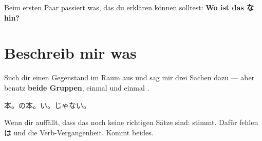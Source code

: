 \documentclass[11pt,a4paper,DIV=12]{scrartcl}
\begin{document}
\begin{merke}
Beim ersten Paar passiert was, das du erklären können solltest:
\textbf{Wo ist das な hin?}
\end{merke}

\section{Beschreib mir was}

Such dir einen Gegenstand im Raum aus und sag mir drei Sachen dazu — aber benutz
\textbf{beide Gruppen}, einmal \expl{} und einmal \impl{}.

\begin{center}
本。の本。い。じゃない。
\end{center}

Wenn dir auffällt, dass das noch keine richtigen Sätze sind: stimmt. Dafür fehlen
は und die Verb-Vergangenheit. Kommt beides.
\end{document}

